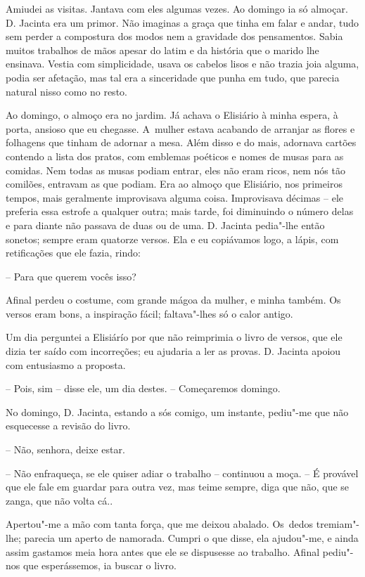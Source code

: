 Amiudei as visitas. Jantava com eles algumas vezes. Ao domingo ia só
almoçar. D. Jacinta era um primor. Não imaginas a graça que tinha em
falar e andar, tudo sem perder a compostura dos modos nem a gravidade
dos pensamentos. Sabia muitos trabalhos de mãos apesar do latim e da
história que o marido lhe ensinava. Vestia com simplicidade, usava os
cabelos lisos e não trazia joia alguma, podia ser afetação, mas tal era
a sinceridade que punha em tudo, que parecia natural nisso como no
resto.

Ao domingo, o almoço era no jardim. Já achava o Elisiário à minha
espera, à porta, ansioso que eu chegasse. A~mulher estava acabando de
arranjar as flores e folhagens que tinham de adornar a mesa. Além disso
e do mais, adornava cartões contendo a lista dos pratos, com emblemas
poéticos e nomes de musas para as comidas. Nem todas as musas podiam
entrar, eles não eram ricos, nem nós tão comilões, entravam as que
podiam. Era ao almoço que Elisiário, nos primeiros tempos, mais
geralmente improvisava alguma coisa. Improvisava décimas -- ele preferia
essa estrofe a qualquer outra; mais tarde, foi diminuindo o número delas
e para diante não passava de duas ou de uma. D. Jacinta pedia"-lhe então
sonetos; sempre eram quatorze versos. Ela e eu copiávamos logo, a lápis,
com retificações que ele fazia, rindo:

-- Para que querem vocês isso?

Afinal perdeu o costume, com grande mágoa da mulher, e minha também. Os
versos eram bons, a inspiração fácil; faltava"-lhes só o calor antigo.

Um dia perguntei a Elisiárío por que não reimprimia o livro de versos,
que ele dizia ter saído com incorreções; eu ajudaria a ler as provas. D.
Jacinta apoiou com entusiasmo a proposta.

-- Pois, sim -- disse ele, um dia destes. -- Começaremos domingo.

No domingo, D. Jacinta, estando a sós comigo, um instante, pediu"-me que
não esquecesse a revisão do livro.

-- Não, senhora, deixe estar.

-- Não enfraqueça, se ele quiser adiar o trabalho -- continuou a moça.
-- É provável que ele fale em guardar para outra vez, mas teime sempre,
diga que não, que se zanga, que não volta cá..

Apertou"-me a mão com tanta força, que me deixou abalado. Os~dedos
tremiam"-lhe; parecia um aperto de namorada. Cumpri o que disse, ela
ajudou"-me, e ainda assim gastamos meia hora antes que ele se dispusesse
ao trabalho. Afinal pediu"-nos que esperássemos, ia buscar o livro.

